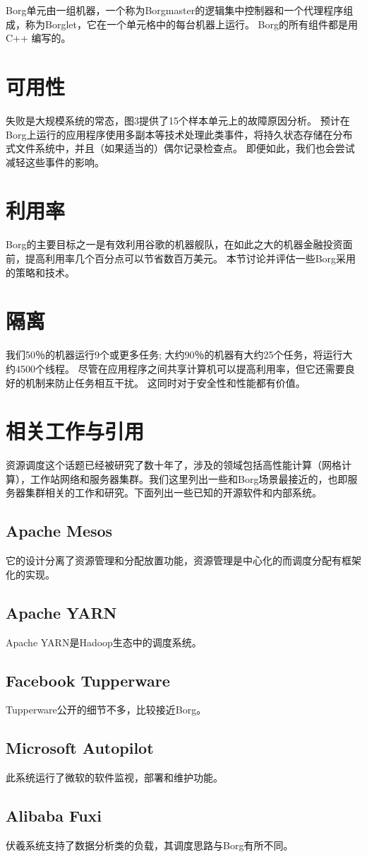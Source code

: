 Borg单元由一组机器，一个称为Borgmaster的逻辑集中控制器和一个代理程序组成，称为Borglet，它在一个单元格中的每台机器上运行。 Borg的所有组件都是用 C++ 编写的。

\section{可用性}

失败是大规模系统的常态，图3提供了15个样本单元上的故障原因分析。 预计在Borg上运行的应用程序使用多副本等技术处理此类事件，将持久状态存储在分布式文件系统中，并且（如果适当的）偶尔记录检查点。 即便如此，我们也会尝试减轻这些事件的影响。

\section{利用率}

Borg的主要目标之一是有效利用谷歌的机器舰队，在如此之大的机器金融投资面前，提高利用率几个百分点可以节省数百万美元。 本节讨论并评估一些Borg采用的策略和技术。

\section{隔离}

我们50％的机器运行9个或更多任务; 大约90％的机器有大约25个任务，将运行大约4500个线程。 尽管在应用程序之间共享计算机可以提高利用率，但它还需要良好的机制来防止任务相互干扰。 这同时对于安全性和性能都有价值。

\section{相关工作与引用}

资源调度这个话题已经被研究了数十年了，涉及的领域包括高性能计算（网格计算），工作站网络和服务器集群。我们这里列出一些和Borg场景最接近的，也即服务器集群相关的工作和研究。下面列出一些已知的开源软件和内部系统。

\subsection{Apache Mesos}

它的设计分离了资源管理和分配放置功能，资源管理是中心化的而调度分配有框架化的实现。

\subsection{Apache YARN}

Apache YARN是Hadoop生态中的调度系统。

\subsection{Facebook Tupperware}

Tupperware公开的细节不多，比较接近Borg。

\subsection{Microsoft Autopilot}

此系统运行了微软的软件监视，部署和维护功能。

\subsection{Alibaba Fuxi}

伏羲系统支持了数据分析类的负载，其调度思路与Borg有所不同。 
